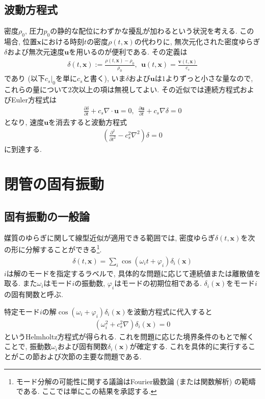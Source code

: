 \documentclass[a4paper,uplatex,dvipdfmx]{jsarticle}
\newcommand{\x}{\bm{x}}
\renewcommand{\v}{\bm{v}}
\renewcommand{\u}{\bm{u}}
\begin{document}
\subsection{波動方程式}\label{sec: wave equation}

密度$\rho_0$, 圧力$p_0$の静的な配位にわずかな擾乱が加わるという状況を考える.
この場合, 位置$\x$における時刻$t$の密度$\rho ( t, \x )$の代わりに, 無次元化された密度ゆらぎ$\delta$および無次元速度$\u$を用いるのが便利である. その定義は
\begin{align}
	\delta ( t, \x ) := \frac{ \rho ( t, \x ) - \rho_0 }{ \rho_0 } , \ \ \u ( t, \x ) = \frac{ \v ( t, \x ) }{ c_s }
\end{align}
であり (以下$c_s |_0$を単に$c_s$と書く), いま$\delta$および$\u$は$1$よりずっと小さな量なので, これらの量について$2$次以上の項は無視してよい.
その近似では連続方程式およびEuler方程式は
\begin{align}
	\frac{ \partial \delta }{ \partial t } + c_s \nabla \cdot \u = 0 , \ \
	\frac{ \partial \u }{ \partial t } + c_s \nabla \delta = 0
\end{align}
となり, 速度$\u$を消去すると波動方程式
\begin{align}
	\left( \frac{ \partial^2 }{ \partial t^2} - c_s^2 \nabla^2 \right) \delta = 0
\end{align}
に到達する.


\section{閉管の固有振動}

\subsection{固有振動の一般論}

媒質のゆらぎに関して線型近似が適用できる範囲では, 密度ゆらぎ$\delta ( t, \x )$を次の形に分解することができる\footnote{モード分解の可能性に関する議論はFourier級数論
(または関数解析) の範疇である. ここでは単にこの結果を承認する.}.
\begin{align}
	\delta ( t, \x ) = \sum_i \cos ( \omega_i t + \varphi_i ) \delta_i ( \x )
\end{align}
$i$は解のモードを指定するラベルで, 具体的な問題に応じて連続値または離散値を取る.
また$\omega_i$はモード$i$の振動数, $\varphi_i$はモードの初期位相である. $\delta_i ( \x )$をモード$i$の固有関数と呼ぶ.

特定モード$i$の解$\cos ( \omega_i + \varphi_i ) \delta_i ( \x )$を波動方程式に代入すると
\begin{align}
	( \omega_i^2 + c_s^2 \nabla ) \delta_i ( \x ) = 0
\end{align}
というHelmholtz方程式が得られる. これを問題に応じた境界条件のもとで解くことで,
振動数$\omega_i$および固有関数$\delta_i ( \x )$が確定する. これを具体的に実行することがこの節および次節の主要な問題である.
\end{document}

